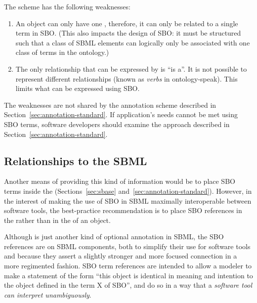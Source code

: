 The scheme has the following weaknesses:
\begin{enumerate}

\item An object can only have one  ,
  therefore, it can only be related to a single term in SBO.
  (This also impacts the design of SBO: it must be structured such
  that a class of SBML elements can logically only be associated
  with one class of terms in the ontology.)

\item The only relationship that can be expressed by
   is ``is a''.  It is not possible to represent
  different relationships (known as \emph{verbs} in
  ontology-speak).  This limits what can be expressed using SBO.

\end{enumerate}

The weaknesses are not shared by the annotation scheme described
in Section~\ref{sec:annotation-standard}.  If application's
needs cannot be met using SBO terms, software developers should
examine the approach described in
Section~\ref{sec:annotation-standard}.

\subsection{Relationships to the SBML  }

Another means of providing this kind of information would be to
place SBO terms inside the  
(Sections~\ref{sec:sbase} and~\ref{sec:annotation-standard}).  However, in the interest of making the
use of SBO in SBML maximally interoperable between software tools,
the best-practice recommendation is to place SBO references in the
  rather than in the  
of an object.

Although  is just another kind of optional
annotation in SBML, the SBO references are  on SBML components, both to simplify their use
for software tools and because they assert a slightly stronger and
more focused connection in a more regimented fashion.  SBO term
references are intended to allow a modeler to make a statement of
the form ``this object is identical in meaning and intention to
the object defined in the term X of SBO'', and do so in a way
that a \emph{software tool can interpret unambiguously}.

